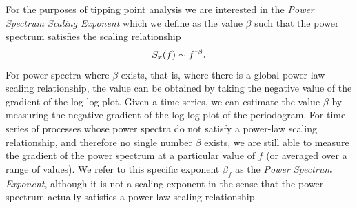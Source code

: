 {{For the purposes of tipping point analysis we are interested in the \emph{Power Spectrum Scaling Exponent} which we define as the value $\beta$ such that the power spectrum satisfies the scaling relationship
	\begin{equation}
		S_x(f) \sim f^{\textup{\texttt{-}}\beta}.
	\end{equation}
For power spectra where $\beta$ exists, that is, where there is a global power-law scaling relationship, the value can be obtained by taking the negative value of the gradient of the log-log plot. Given a time series, we can estimate the value $\beta$ by measuring the negative gradient of the log-log plot of the periodogram. For time series of processes whose power spectra do not satisfy a power-law scaling relationship, and therefore no single number $\beta$ exists, we are still able to measure the gradient of the power spectrum at a particular value of $f$ (or averaged over a range of values). We refer to this specific exponent $\beta_f$ as the \emph{Power Spectrum Exponent}, although it is not a scaling exponent in the sense that the power spectrum actually satisfies a power-law scaling relationship. 

}}
